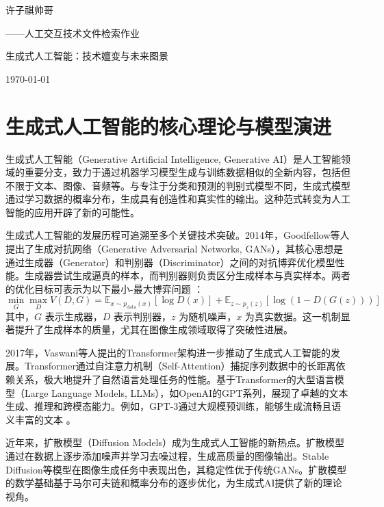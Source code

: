 \documentclass{ctexart}
\begin{document}
\begin{titlepage}
    \centering
    { 许子祺帅哥\par}
    \vspace{0.5cm}
    { ——人工交互技术文件检索作业\par}
    \vspace{1cm}
    { 生成式人工智能：技术嬗变与未来图景\par}
    \vspace{1cm}
    { \today\par}
\end{titlepage}

\section{生成式人工智能的核心理论与模型演进}

生成式人工智能（Generative Artificial Intelligence, Generative AI）\cite{banh2023generative}是人工智能领域的重要分支，致力于通过机器学习模型生成与训练数据相似的全新内容，包括但不限于文本、图像、音频等。与专注于分类和预测的判别式模型不同，生成式模型通过学习数据的概率分布，生成具有创造性和真实性的输出。这种范式转变为人工智能的应用开辟了新的可能性\cite{ooi2025potential}。

生成式人工智能的发展历程可追溯至多个关键技术突破。2014年，Goodfellow等人提出了生成对抗网络（Generative Adversarial Networks, GANs）\cite{saxena2021generative}，其核心思想是通过生成器（Generator）和判别器（Discriminator）之间的对抗博弈优化模型性能。生成器尝试生成逼真\cite{ji2023survey}的样本，而判别器则负责区分生成样本与真实样本。两者的优化目标可表示为以下最小-最大博弈问题 \cite{goodfellow2014generative}：
\[
\min_G \max_D V(D, G) = \mathbb{E}_{x \sim p_{\text{data}}(x)}[\log D(x)] + \mathbb{E}_{z \sim p_z(z)}[\log (1 - D(G(z)))]
\]
其中，\(G\) 表示生成器，\(D\) 表示判别器，\(z\) 为随机噪声，\(x\) 为真实数据。这一机制显著提升了生成样本的质量，尤其在图像生成领域取得了突破性进展。

2017年，Vaswani等人提出的Transformer架构进一步推动了生成式人工智能的发展。Transformer通过自注意力机制（Self-Attention）捕捉序列数据中的长距离依赖关系，极大地提升了自然语言处理任务的性能。基于Transformer的大型语言模型（Large Language Models, LLMs），如OpenAI的GPT系列，展现了卓越的文本生成、推理和跨模态能力。例如，GPT-3通过大规模预训练，能够生成流畅且语义丰富的文本 \cite{vaswani2017attention}。

近年来，扩散模型（Diffusion Models）成为生成式人工智能的新热点。扩散模型通过在数据上逐步添加噪声并学习去噪过程，生成高质量的图像输出。Stable Diffusion等模型在图像生成任务中表现出色，其稳定性优于传统GANs。扩散模型的数学基础基于马尔可夫链和概率分布的逐步优化，为生成式AI提供了新的理论视角\cite{yang2023diffusion}。
\end{document}
